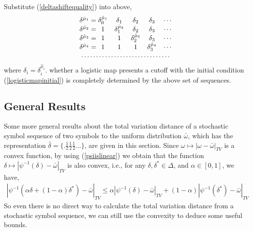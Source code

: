 \documentclass{article}
\begin{document}
Substitute (\ref{deltashiftequality}) into above, 
\begin{eqnarray}
\begin{array}{c@{{}={}}ccccc} 
 \delta^{\hat{\mu}_1} & \delta_{0}^{\hat{\mu}_1} & \delta_{1}               & \delta_{2}              & \delta_{3}              &\cdots   \\
 \delta^{\hat{\mu}_2} & 1                        & \delta_{1}^{\hat{\mu}_2} & \delta_{2}              & \delta_{3}              &\cdots   \\
 \delta^{\hat{\mu}_3} & 1                        & 1                        & \delta_{2}^{\hat{\mu}_3}& \delta_{3}              &\cdots   \\
 \delta^{\hat{\mu}_4} & 1                        & 1                        & 1                       & \delta_{3}^{\hat{\mu}_4}& \cdots  \\
   \multicolumn{6}{c}{\dotfill}
\end{array}
\end{eqnarray}
where $\delta_i = \delta_{i}^{\hat{\mu}_i}$. whether a logistic map presents a cutoff with the initial condition (\ref{logisticmapinitial}) is completely determined by the above set of sequences.




\subsection{General Results}
Some more general results about the total variation distance of a stochastic symbol sequence of two symbols to the uniform distribution $\bar{\omega}$, which has the representation $\bar{\delta}=\{.\frac{1}{2}\frac{1}{2}\frac{1}{2}...\}$, are given in this section. Since $\omega \mapsto |\omega-\bar{\omega}|_{TV}$ is a convex function, by using (\ref{psiislinear}) we obtain that the function $\delta \mapsto |\psi^{-1}(\delta)-\bar{\omega}|_{TV} $ is also convex, i.e., for any $\delta, \delta^* \in \Delta$, and $\alpha \in [0,1]$, we have,
 \begin{eqnarray}
\label{convexityofTV}
|\psi^{-1}(\alpha\delta+(1-\alpha)\delta^*)-\bar{\omega}|_{TV} \le 
            \alpha|\psi^{-1}(\delta)-\bar{\omega} |_{TV}+(1-\alpha)|\psi^{-1}(\delta^*)-\bar{\omega}|_{TV}
 \end{eqnarray}
So even there is no direct way to calculate the total variation distance from a stochastic symbol sequence, we can still use the convexity to deduce some useful bounds. 
\end{document}
